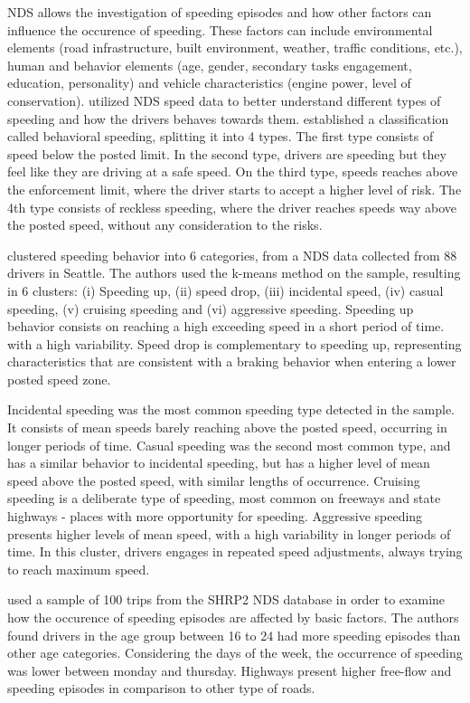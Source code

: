 NDS allows the investigation of speeding episodes and how other factors can influence the occurence of speeding. These factors can include environmental elements (road infrastructure, built environment, weather, traffic conditions, etc.), human and behavior elements (age, gender, secondary tasks engagement, education, personality) and vehicle characteristics (engine power, level of conservation). \textcite{Richard2013,Richard2017, Richard2020} utilized NDS speed data to better understand different types of speeding and how the drivers behaves towards them. \textcite{Richard2013} established a classification called behavioral speeding, splitting it into 4 types. The first type consists of speed below the posted limit. In the second type, drivers are speeding but they feel like they are driving at a safe speed. On the third type, speeds reaches above the enforcement limit, where the driver starts to accept a higher level of risk. The 4th type consists of reckless speeding, where the driver reaches speeds way above the posted speed, without any consideration to the risks. 

\textcite{Richard2017} clustered speeding behavior into 6 categories, from a NDS data collected from 88 drivers in Seattle. The authors used the k-means method on the sample, resulting in 6 clusters: (i) Speeding up, (ii) speed drop, (iii) incidental speed, (iv) casual speeding, (v) cruising speeding and (vi) aggressive speeding. Speeding up behavior consists on reaching a high exceeding speed in a short period of time. with a high variability. Speed drop is complementary to speeding up, representing characteristics that are consistent with a braking behavior when entering a lower posted speed zone. 

Incidental speeding was the most common speeding type detected in the sample. It consists of mean speeds barely reaching above the posted speed, occurring in longer periods of time. Casual speeding was the second most common type, and has a similar behavior to incidental speeding, but has a higher level of mean speed above the posted speed, with similar lengths of occurrence. Cruising speeding is a deliberate type of speeding, most common on freeways and state highways - places with more opportunity for speeding. Aggressive speeding presents higher levels of mean speed, with a high variability in longer periods of time. In this cluster, drivers engages in repeated speed adjustments, always trying to reach maximum speed.

\textcite{Richard2020} used a sample of 100 trips from the SHRP2 NDS database in order to examine how the occurence of speeding episodes are affected by basic factors. The authors found drivers in the age group between 16 to 24 had more speeding episodes than other age categories. Considering the days of the week, the occurrence of speeding was lower between monday and thursday. Highways present higher free-flow and speeding episodes in comparison to other type of roads. 

